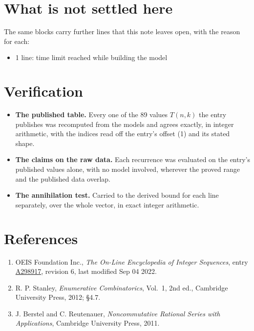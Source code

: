 \documentclass[11pt]{article}
\theoremstyle{definition}
\begin{document}
\section{What is not settled here}

The same blocks carry further lines that this note leaves open, with the reason for each:

\begin{itemize}

\item 1 line: time limit reached while building the model

\end{itemize}

\section{Verification}

\begin{itemize}

\item {\bfseries The published table.} Every one of the 89 values $T(n,k)$ the entry publishes was recomputed from the models and agrees exactly, in integer arithmetic, with the indices read off the entry's offset (1) and its stated shape.

\item {\bfseries The claims on the raw data.} Each recurrence was evaluated on the entry's published values alone, with no model involved, wherever the proved range and the published data overlap.

\item {\bfseries The annihilation test.} Carried to the derived bound for each line separately, over the whole vector, in exact integer arithmetic.

\end{itemize}

\section{References}

\begin{enumerate}

\item OEIS Foundation Inc., \emph{The On-Line Encyclopedia of Integer Sequences}, entry \href{https://oeis.org/A298917}{A298917}, revision 6, last modified Sep 04 2022.

\item R. P. Stanley, \emph{Enumerative Combinatorics}, Vol.~1, 2nd ed., Cambridge University Press, 2012; \S4.7.

\item J. Berstel and C. Reutenauer, \emph{Noncommutative Rational Series with Applications}, Cambridge University Press, 2011.

\end{enumerate}
\end{document}
